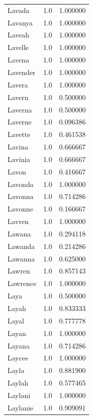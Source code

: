 \documentclass[
  letterpaper,
  DIV=11,
  numbers=noendperiod]{scrreprt}
\begin{document}
\begin{tabular}{lrr}
Lavada          &   1.0 &   1.000000 \\
Lavanya         &   1.0 &   1.000000 \\
Laveah          &   1.0 &   1.000000 \\
Lavelle         &   1.0 &   1.000000 \\
Lavena          &   1.0 &   1.000000 \\
Lavender        &   1.0 &   1.000000 \\
Lavera          &   1.0 &   1.000000 \\
Lavern          &   1.0 &   0.500000 \\
Laverna         &   1.0 &   0.500000 \\
Laverne         &   1.0 &   0.096386 \\
Lavette         &   1.0 &   0.461538 \\
Lavina          &   1.0 &   0.666667 \\
Lavinia         &   1.0 &   0.666667 \\
Lavon           &   1.0 &   0.416667 \\
Lavonda         &   1.0 &   1.000000 \\
Lavonna         &   1.0 &   0.714286 \\
Lavonne         &   1.0 &   0.166667 \\
Lavren          &   1.0 &   1.000000 \\
Lawana          &   1.0 &   0.294118 \\
Lawanda         &   1.0 &   0.214286 \\
Lawanna         &   1.0 &   0.625000 \\
Lawren          &   1.0 &   0.857143 \\
Lawrence        &   1.0 &   1.000000 \\
Laya            &   1.0 &   0.500000 \\
Layah           &   1.0 &   0.833333 \\
Layal           &   1.0 &   0.777778 \\
Layan           &   1.0 &   1.000000 \\
Layana          &   1.0 &   0.714286 \\
Laycee          &   1.0 &   1.000000 \\
Layla           &   1.0 &   0.881900 \\
Laylah          &   1.0 &   0.577465 \\
Laylani         &   1.0 &   1.000000 \\
Laylanie        &   1.0 &   0.909091 \\

\end{tabular}
\end{document}
